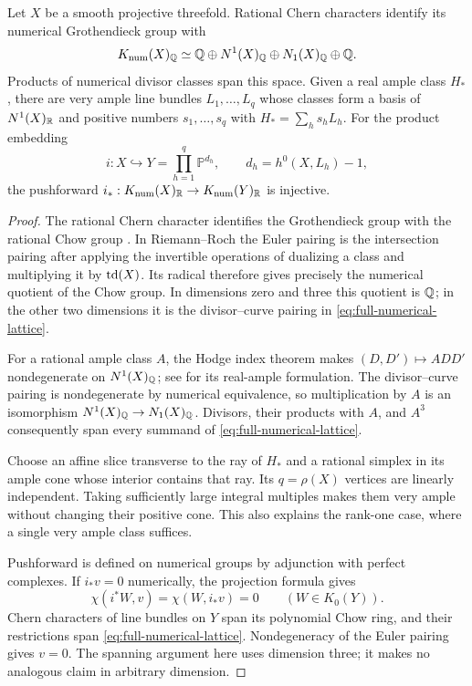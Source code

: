 \begin{lemma}\label{lem:full-numerical-embedding}
Let $X$ be a smooth projective threefold.  Rational Chern characters identify
its numerical Grothendieck group with
\begin{equation}\label{eq:full-numerical-lattice}
 K_{\mathrm{num}}(X)_\mathbb Q\simeq
 \mathbb Q\oplus N^1(X)_\mathbb Q\oplus N_1(X)_\mathbb Q\oplus\mathbb Q.
\end{equation}
Products of numerical divisor classes span this space.  Given a real ample
class $H_*$, there are very ample line bundles $L_1,\ldots,L_q$ whose classes
form a basis of $N^1(X)_\mathbb R$ and positive numbers $s_1,\ldots,s_q$ with
$H_*=\sum_hs_hL_h$.  For the product embedding
\begin{equation}\label{eq:product-embedding}
 i:X\hookrightarrow Y=\prod_{h=1}^q\mathbb P^{d_h},
 \qquad d_h=h^0(X,L_h)-1,
\end{equation}
the pushforward $i_*:K_{\mathrm{num}}(X)_\mathbb R\to K_{\mathrm{num}}(Y)_\mathbb R$ is injective.
\end{lemma}

\begin{proof}
The rational Chern character identifies the Grothendieck group with the
rational Chow group
\cite[Tags 0FDI, 0FEW, 0FB2 and 0FB5]{StacksProject}.  In Riemann--Roch the Euler pairing is the intersection
pairing after applying the invertible operations of dualizing a class and
multiplying it by $\operatorname{td}(X)$.  Its radical therefore gives precisely the
numerical quotient of the Chow group.  In dimensions zero and three this
quotient is $\mathbb Q$; in the other two dimensions it is the divisor--curve
pairing in \eqref{eq:full-numerical-lattice}.

For a rational ample class $A$, the Hodge index theorem makes
$(D,D')\mapsto ADD'$ nondegenerate on $N^1(X)_\mathbb Q$; see
\cite[Theorem~6.4 and Corollary~6.5]{GrebRossToma2016} for its
real-ample formulation.  The divisor--curve
pairing is nondegenerate by numerical equivalence, so multiplication by $A$
is an isomorphism $N^1(X)_\mathbb Q\to N_1(X)_\mathbb Q$.  Divisors, their products with
$A$, and $A^3$ consequently span every summand of
\eqref{eq:full-numerical-lattice}.

Choose an affine slice transverse to the ray of $H_*$ and a rational simplex
in its ample cone whose interior contains that ray.  Its $q=\rho(X)$
vertices are linearly independent.  Taking sufficiently large integral
multiples makes them very ample without changing their positive cone.  This
also explains the rank-one case, where a single very ample class suffices.

Pushforward is defined on numerical groups by adjunction with perfect
complexes.  If $i_*v=0$ numerically, the projection formula gives
\[
 \chi(i^*W,v)=\chi(W,i_*v)=0\qquad(W\in K_0(Y)).
\]
Chern characters of line bundles on $Y$ span its polynomial Chow ring, and
their restrictions span \eqref{eq:full-numerical-lattice}.  Nondegeneracy of
the Euler pairing gives $v=0$.  The spanning argument here uses dimension
three; it makes no analogous claim in arbitrary dimension.
\end{proof}

